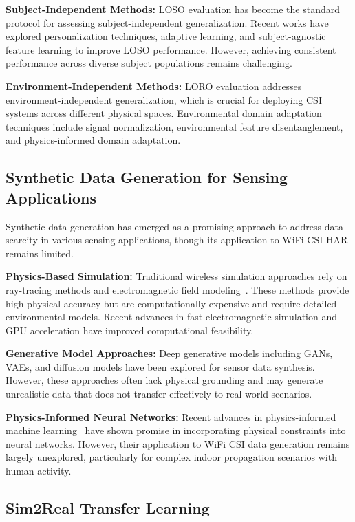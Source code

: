 \documentclass[journal]{IEEEtran}
\begin{document}
\textbf{Subject-Independent Methods:} LOSO evaluation has become the standard protocol for assessing subject-independent generalization. Recent works have explored personalization techniques, adaptive learning, and subject-agnostic feature learning to improve LOSO performance. However, achieving consistent performance across diverse subject populations remains challenging.

\textbf{Environment-Independent Methods:} LORO evaluation addresses environment-independent generalization, which is crucial for deploying CSI systems across different physical spaces. Environmental domain adaptation techniques include signal normalization, environmental feature disentanglement, and physics-informed domain adaptation.

\subsection{Synthetic Data Generation for Sensing Applications}

Synthetic data generation has emerged as a promising approach to address data scarcity in various sensing applications, though its application to WiFi CSI HAR remains limited.

\textbf{Physics-Based Simulation:} Traditional wireless simulation approaches rely on ray-tracing methods and electromagnetic field modeling~\cite{ray_tracing_wireless2000}. These methods provide high physical accuracy but are computationally expensive and require detailed environmental models. Recent advances in fast electromagnetic simulation and GPU acceleration have improved computational feasibility.

\textbf{Generative Model Approaches:} Deep generative models including GANs, VAEs, and diffusion models have been explored for sensor data synthesis. However, these approaches often lack physical grounding and may generate unrealistic data that does not transfer effectively to real-world scenarios.

\textbf{Physics-Informed Neural Networks:} Recent advances in physics-informed machine learning~\cite{pinn_karniadakis2021} have shown promise in incorporating physical constraints into neural networks. However, their application to WiFi CSI data generation remains largely unexplored, particularly for complex indoor propagation scenarios with human activity.

\subsection{Sim2Real Transfer Learning}
\end{document}
